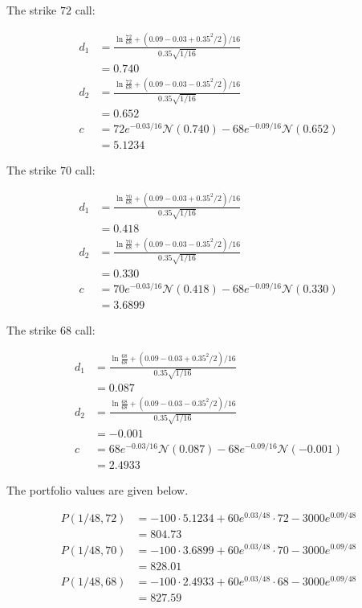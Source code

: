 \documentclass{ximera}
\begin{document}
The strike $72$ call:

\begin{align*}
d_1 		&=\frac{\ln\frac{72}{68}+(0.09-0.03+0.35^2/2)/16}{0.35\sqrt{1/16}}\\
		&=0.740\\
d_2 		&=\frac{\ln\frac{72}{68}+(0.09-0.03-0.35^2/2)/16}{0.35\sqrt{1/16}}\\
		&=0.652\\
c 		&=72e^{-0.03/16}\mathcal{N}(0.740)-68e^{-0.09/16}\mathcal{N}(0.652)\\
		&=5.1234
\end{align*}

The strike $70$ call:

\begin{align*}
d_1 		&=\frac{\ln\frac{70}{68}+(0.09-0.03+0.35^2/2)/16}{0.35\sqrt{1/16}}\\
		&=0.418\\
d_2 		&=\frac{\ln\frac{70}{68}+(0.09-0.03-0.35^2/2)/16}{0.35\sqrt{1/16}}\\
		&=0.330\\
c 		&=70e^{-0.03/16}\mathcal{N}(0.418)-68e^{-0.09/16}\mathcal{N}(0.330)\\
		&=3.6899
\end{align*}

The strike $68$ call:

\begin{align*}
d_1 		&=\frac{\ln\frac{68}{68}+(0.09-0.03+0.35^2/2)/16}{0.35\sqrt{1/16}}\\
		&=0.087\\
d_2 		&=\frac{\ln\frac{68}{68}+(0.09-0.03-0.35^2/2)/16}{0.35\sqrt{1/16}}\\
		&=-0.001\\
c 		&=68e^{-0.03/16}\mathcal{N}(0.087)-68e^{-0.09/16}\mathcal{N}(-0.001)\\
		&=2.4933
\end{align*}

The portfolio values are given below.

\begin{align*}
P(1/48,72) 	&=-100\cdot 5.1234+60e^{0.03/48}\cdot 72-3000e^{0.09/48}\\
		&=804.73\\
P(1/48,70) 	&=-100\cdot 3.6899+60e^{0.03/48}\cdot 70-3000e^{0.09/48}\\
		&=828.01\\
P(1/48,68) 	&=-100\cdot 2.4933 +60e^{0.03/48}\cdot 68-3000e^{0.09/48}\\
		&=827.59
\end{align*}
\end{document}
